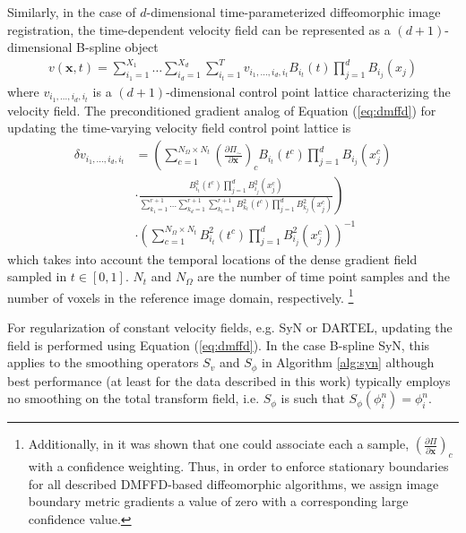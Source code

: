 \documentclass{frontiersSCNS}
\begin{document}
Similarly, in the case of $d$-dimensional time-parameterized 
diffeomorphic image registration, 
the time-dependent velocity field can be represented
as a $(d + 1)$-dimensional B-spline object
\begin{align}
v(\mathbf{x}, t) = \sum_{i_1=1}^{X_1}\ldots\sum_{i_d=1}^{X_d}\sum_{i_t=1}^T v_{i_1,\ldots,i_d,i_t} B_{i_t}(t) \prod_{j=1}^d B_{i_j}(x_j)
\end{align}
where $v_{i_1,\ldots,i_d,i_t}$ is a $(d+1)$-dimensional control point lattice
characterizing the velocity field.  The preconditioned gradient analog of
Equation (\ref{eq:dmffd}) for updating the time-varying velocity field control point lattice is 
\begin{align}
\label{eq:tvdmffd}
  \delta v_{i_1,\ldots,i_d,i_t} &= \left( \sum_{c=1}^{N_{\Omega} \times N_t} \left( \frac{\partial \Pi_\sim}{\partial \mathbf{x}} \right)_c B_{i_t}(t^c)\prod_{j=1}^d B_{i_j}(x_j^c)  \right. \nonumber \\
  &\cdot \left. \frac{B_{i_t}^2(t^c) \prod_{j=1}^d B_{i_j}^2 (x_j^c)}
  {\sum_{k_1=1}^{r+1}\ldots\sum_{k_d=1}^{r+1} \sum_{k_t=1}^{r+1} B_{k_t}^2(t^c)
  \prod_{j=1}^d B_{k_j}^2 (x_j^c)} \right) \nonumber \\
  &\cdot\left({\sum_{c=1}^{N_{\Omega}\times N_t}B_{i_t}^2(t^c) \prod_{j=1}^d B_{i_j}^2 (x_j^c)} \right) ^{-1}
\end{align}
which takes into account the temporal locations of the
dense gradient field sampled in $t \in [0,1]$. $N_t$ and $N_\Omega$ are the number
of time point samples and the number of voxels in the reference image domain, respectively.
\footnote{
Additionally, in \cite{tustison2006} it was shown that one could associate each
a sample, $\left( \frac{\partial \Pi}{\partial \mathbf{x}}\right)_c$ with a confidence
weighting.  Thus, in order to enforce stationary boundaries for all described
DMFFD-based diffeomorphic algorithms, we
assign image boundary metric gradients a value of zero with a corresponding
large confidence value.
}

For regularization of constant velocity fields, e.g. SyN or DARTEL, updating the 
field is performed using Equation (\ref{eq:dmffd}).  In the case B-spline SyN, 
this applies to the smoothing operators $S_{v}$ and $S_{\phi}$ in Algorithm \ref{alg:syn}
although best performance (at least for the data described in this work) typically
employs no smoothing on the total transform field, i.e. $S_\phi$ is such that $S_\phi( \phi_i^n ) = \phi_i^n$.
\end{document}
